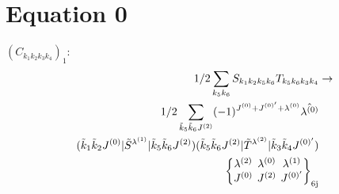 \documentclass[11pt]{article}
\newcommand{\sixj}[6]{\begingroup\setlength{\arraycolsep}{0.2em}\begin{Bmatrix} #1 & #2 & #3 \\ #4 & #5 & #6 \end{Bmatrix}_{\text{6j}}\endgroup}
\begin{document}
\section{Equation 0}
$\left({C}_{{k}_{1}{k}_{2}{k}_{3}{k}_{4}}\right)_{1}$:
\begin{align}
1/2\sum_{{k}_{5}{k}_{6}}{S}_{{k}_{1}{k}_{2}{k}_{5}{k}_{6}}{T}_{{k}_{5}{k}_{6}{k}_{3}{k}_{4}}&\rightarrow \notag \\1/2\sum_{\tilde{k}_{5}\tilde{k}_{6}J^{(2)}}(-1)^{J^{(0)} +J^{(0)'} +\lambda^{(0)} }\hat{\lambda^{(0)}}& \notag \\(\tilde{k}_{1}\tilde{k}_{2}J^{(0)}|\tilde{S}{}^{\lambda^{(1)}}|\tilde{k}_{5}\tilde{k}_{6}J^{(2)})(\tilde{k}_{5}\tilde{k}_{6}J^{(2)}|\tilde{T}{}^{\lambda^{(2)}}|\tilde{k}_{3}\tilde{k}_{4}J^{(0)'})& \notag \\\sixj{\lambda^{(2)}}{\lambda^{(0)}}{\lambda^{(1)}}{J^{(0)}}{J^{(2)}}{J^{(0)'}}
\end{align}
\end{document}

